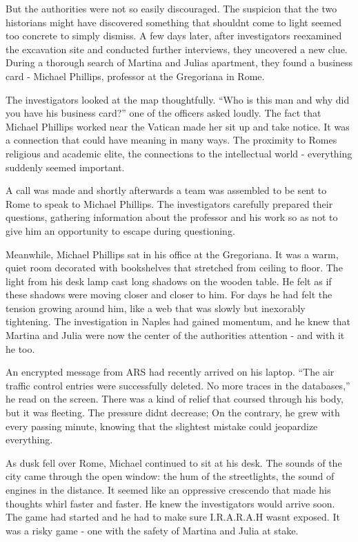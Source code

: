 \documentclass[
]{article}
\begin{document}
But the authorities were not so easily discouraged. The suspicion that
the two historians might have discovered something that
shouldn\textquotesingle t come to light seemed too concrete to simply
dismiss. A few days later, after investigators reexamined the excavation
site and conducted further interviews, they uncovered a new clue. During
a thorough search of Martina and Julia\textquotesingle s apartment, they
found a business card - Michael Phillips, professor at the Gregoriana in
Rome.

The investigators looked at the map thoughtfully. ``Who is this man and
why did you have his business card?'' one of the officers asked loudly.
The fact that Michael Phillips worked near the Vatican made her sit up
and take notice. It was a connection that could have meaning in many
ways. The proximity to Rome\textquotesingle s religious and academic
elite, the connections to the intellectual world - everything suddenly
seemed important.

A call was made and shortly afterwards a team was assembled to be sent
to Rome to speak to Michael Phillips. The investigators carefully
prepared their questions, gathering information about the professor and
his work so as not to give him an opportunity to escape during
questioning.

Meanwhile, Michael Phillips sat in his office at the Gregoriana. It was
a warm, quiet room decorated with bookshelves that stretched from
ceiling to floor. The light from his desk lamp cast long shadows on the
wooden table. He felt as if these shadows were moving closer and closer
to him. For days he had felt the tension growing around him, like a web
that was slowly but inexorably tightening. The investigation in Naples
had gained momentum, and he knew that Martina and Julia were now the
center of the authorities\textquotesingle{} attention - and with it he
too.

An encrypted message from ARS had recently arrived on his laptop. ``The
air traffic control entries were successfully deleted. No more traces in
the databases,'' he read on the screen. There was a kind of relief that
coursed through his body, but it was fleeting. The pressure
didn\textquotesingle t decrease; On the contrary, he grew with every
passing minute, knowing that the slightest mistake could jeopardize
everything.

As dusk fell over Rome, Michael continued to sit at his desk. The sounds
of the city came through the open window: the hum of the streetlights,
the sound of engines in the distance. It seemed like an oppressive
crescendo that made his thoughts whirl faster and faster. He knew the
investigators would arrive soon. The game had started and he had to make
sure I.R.A.R.A.H wasn\textquotesingle t exposed. It was a risky game -
one with the safety of Martina and Julia at stake.
\end{document}
